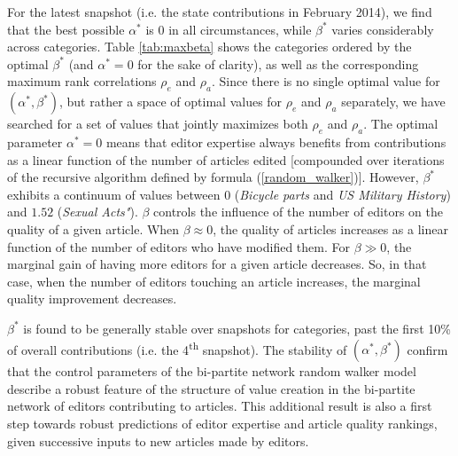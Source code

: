 
For the latest snapshot (i.e. the state contributions in February 2014), we find that the best possible $\alpha^*$ is $0$ in all circumstances, while $\beta^*$ varies considerably across categories. Table \ref{tab:maxbeta} shows the categories ordered by the optimal $\beta^*$ (and $\alpha^*=0$ for the sake of clarity), as well as the corresponding maximum rank correlations $\rho_e$ and $\rho_a$. Since there is no single optimal value for $(\alpha^*,\beta^*)$, but rather a space of optimal values for  $\rho_e$ and $\rho_a$ separately, we have searched for a set of values that jointly maximizes both $\rho_e$ and $\rho_a$. The optimal parameter $\alpha^* = 0$ means that editor expertise always benefits from contributions as a linear function of the number of articles edited [compounded over iterations of the recursive algorithm defined by formula (\ref{random_walker})].  However, $\beta^*$ exhibits a continuum of values between $0$ ({\it Bicycle parts} and {\it US Military History}) and $1.52$ ({\it Sexual Acts"}). $\beta$ controls the influence of the number of editors on the quality of a given article. When $\beta \approx 0$, the quality of articles increases as a linear function of the number of editors who have modified them. For $\beta \gg 0$, the marginal gain of having more editors for a given article decreases. So, in that case, when the number of editors touching an article increases, the marginal quality improvement decreases.

$\beta^*$ is found to be generally stable over snapshots for categories, past the first 10\% of overall contributions (i.e. the 4\textsuperscript{th} snapshot). 
The stability of $(\alpha^*,\beta^*)$ confirm that the control parameters of the bi-partite network random walker model describe a robust feature of the structure of value creation in the bi-partite network of editors contributing to articles. This additional result is also a first step towards robust predictions of editor expertise and article quality rankings, given successive inputs to new articles made by editors.


